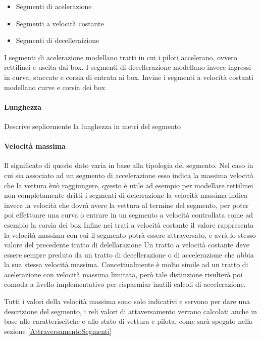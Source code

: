 \documentclass[a4paper,11pt, twoside]{book}
\begin{document}
	  \begin{itemize}
	    \item Segmenti di acelerazione
	    \item Segmenti a velocità costante
	    \item Segmenti di decelleraizione
	  \end{itemize}
	  
	  I segmenti di acelerazione modellano tratti in cui i piloti accelerano, ovvero rettilinei e uscita dai box. I segmenti di
	  decellerazione modellano invece ingressi in curva, staccate e corsia di entrata ai box. Invine
	  i segmenti a velocità costanti modellano curve e corsia dei box
	  
	\paragraph{Lunghezza}
	  Descrive seplicemente la lunghezza in metri del segmento
	
	\paragraph{Velocità massima}
	  Il significato di questo dato varia in base alla tipologia del segmento. Nel caso
	  in cui sia associato ad un segmento di accelerazione esso indica la massima velocità che la vettura èuò raggiungere,
	  qyesto è utile ad esempio per modellare rettilinei non completamente dritti
	  i segmenti di delerrazione la velocità massima indica invece la velocità che dovrà avere la vettura al termine del
	  segmento, per poter poi effettuare una curva o entrare in un segmento a velocità controllata come ad esempio la
	  corsia dei box
	  Infine nei trati a velocità costante il valore rappresenta la velocità massima con cui il segmento potrà essere attraversato, 
	  e avrà lo stesso valore del precedente tratto di delellarazione
	  Un tratto a velocità costante deve essere sempre preduto da un tratto di decellerazione o di accelerazione
	  che abbia la sua stessa velocità massima. Concettualmente è molto simile ad un tratto di acelerazione
	  con velocità massima limitata, però tale distinzione risulterà poi comoda a livello implementativo
	  per risparmiar inutili calcoli di accelerazione.
	  
	  Tutti i valori della velocità massima sono solo indicativi e servono per dare una descrizione del segmento,
	  i reli valori di attaversamento verrano calcolati anche in base alle caratteriscitche e allo stato di 
	  vettura e pilota, come sarà spegato nella sezione \ref{AttraversamentoSegmenti}
	  
\end{document}
